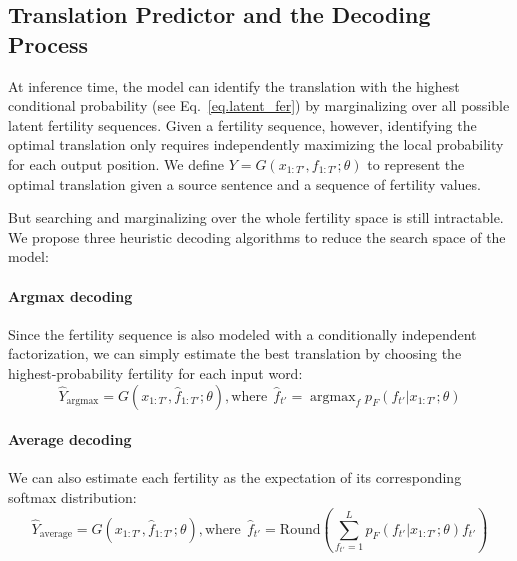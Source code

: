 \documentclass{article} \usepackage{iclr2018_conference,times}
\DeclareMathOperator*{\argmax}{argmax} \DeclareMathOperator*{\argminB}{argmin}   \DeclareMathOperator*{\argminC}{\arg\min}
\begin{document}
\subsection{Translation Predictor and the Decoding Process}
At inference time, the model can identify the translation with the highest conditional probability (see Eq.~\ref{eq.latent_fer}) by marginalizing over all possible latent fertility sequences. 
Given a fertility sequence, however, identifying the optimal translation only requires independently maximizing the local probability for each output position.
We define $Y = G(x_{1:T'}, f_{1:T'}; \theta)$ to represent the optimal translation given a source sentence and a sequence of fertility values.

But searching and marginalizing over the whole fertility space is still intractable. We propose three heuristic decoding algorithms to reduce the search space of the \model{} model:

\vspace{-5pt}
\paragraph{Argmax decoding} Since the fertility sequence is also modeled with a conditionally independent factorization, we can simply estimate the best translation by choosing the highest-probability fertility for each input word:
\begin{equation}
	\hat{Y}_\text{argmax} = G(x_{1:T'}, \hat{f}_{1:T'};\theta), \textrm{where} \ \ \hat{f}_{t'}=\argmax_f p_F(f_{t'}|x_{1:T'};\theta)
\end{equation}


\vspace{-5pt}
\paragraph{Average decoding}
We can also estimate each fertility as the expectation of its corresponding softmax distribution:
\begin{equation}
	\hat{Y}_\text{average} = G(x_{1:T'}, \hat{f}_{1:T'};\theta), \textrm{where} \ \ \hat{f}_{t'}=\textrm{Round}\left(\sum_{f_{t'}=1}^L p_F(f_{t'}|x_{1:T'};\theta)f_{t'}\right)
    \label{eq.average}
\end{equation}

\vspace{-5pt}
\end{document}
